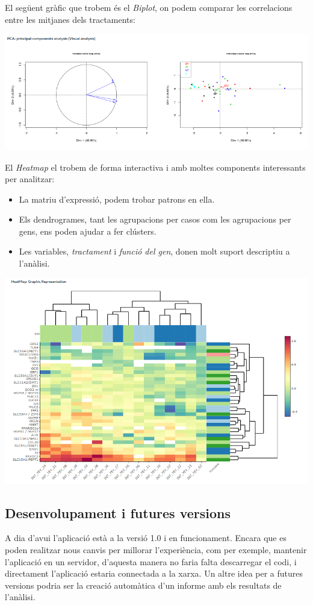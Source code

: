\documentclass[english]{article}
\begin{document}
El següent gràfic que trobem és el \textit{Biplot}, on podem comparar les correlacions entre les mitjanes dels tractaments:
\begin{center}
\includegraphics[scale=0.5]{app5.png}
\end{center}
\clearpage
\twocolumn
El \textit{Heatmap} el trobem de forma interactiva i amb moltes components interessants per analitzar:
\begin{itemize}
\item La matriu d'expressió, podem trobar patrons en ella.
\item Els dendrogrames, tant les agrupacions per casos com les agrupacions per gens, ens poden ajudar a fer clústers.
\item Les variables, \textit{tractament} i \textit{funció del gen}, donen molt suport descriptiu a l'anàlisi.
\end{itemize}
\begin{center}
\includegraphics[scale=0.6]{app6.png}
\end{center}
\clearpage
\twocolumn
\subsection{Desenvolupament i futures versions}
A dia d'avui l'aplicació està a la versió 1.0 i en funcionament. Encara que es poden realitzar nous canvis per millorar l'experiència, com per exemple, mantenir l'aplicació en un servidor, d'aquesta manera no faria falta descarregar el codi, i directament l'aplicació estaria connectada a la xarxa. Un altre idea per a futures versions podria ser la creació automàtica d'un informe amb els resultats de l'anàlisi.
\\
\end{document}
